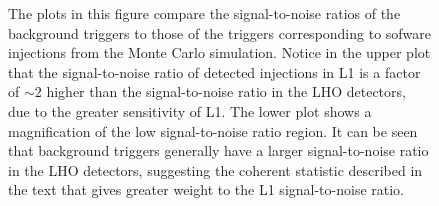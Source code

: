 \begin{figure}[p]
{\label{f:bkg_inj}%
The plots in this figure compare the signal-to-noise ratios of the background
triggers to those of the triggers corresponding to sofware injections from the
Monte Carlo simulation. Notice in the upper plot that the signal-to-noise
ratio of detected injections in L1 is a factor of $\sim 2$ higher than the
signal-to-noise ratio in the LHO detectors, due to the greater sensitivity of
L1. The lower plot shows a magnification of the low signal-to-noise ratio
region. It can be seen that background triggers generally have a larger
signal-to-noise ratio in the LHO detectors, suggesting the coherent statistic
described in the text that gives greater weight to the L1 signal-to-noise
ratio.
}
\end{figure}




